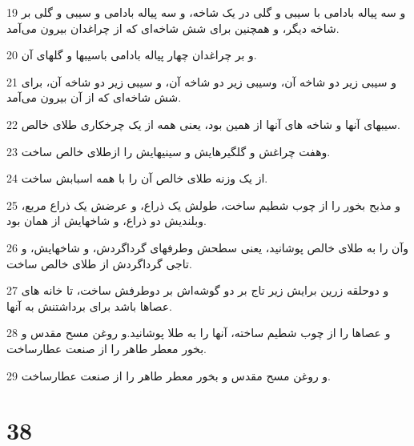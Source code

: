 \par 19 و سه پیاله بادامی با سیبی و گلی در یک شاخه، و سه پیاله بادامی و سیبی و گلی بر شاخه دیگر، و همچنین برای شش شاخه‌ای که از چراغدان بیرون می‌آمد.
\par 20 و بر چراغدان چهار پیاله بادامی باسیبها و گلهای آن.
\par 21 و سیبی زیر دو شاخه آن، وسیبی زیر دو شاخه آن، و سیبی زیر دو شاخه آن، برای شش شاخه‌ای که از آن بیرون می‌آمد.
\par 22 سیبهای آنها و شاخه های آنها از همین بود، یعنی همه از یک چرخکاری طلای خالص.
\par 23 وهفت چراغش و گلگیرهایش و سینیهایش را ازطلای خالص ساخت.
\par 24 از یک وزنه طلای خالص آن را با همه اسبابش ساخت.
\par 25 و مذبح بخور را از چوب شطیم ساخت، طولش یک ذراع، و عرضش یک ذراع مربع، وبلندیش دو ذراع، و شاخهایش از همان بود.
\par 26 وآن را به طلای خالص پوشانید، یعنی سطحش وطرفهای گرداگردش، و شاخهایش، و تاجی گرداگردش از طلای خالص ساخت.
\par 27 و دوحلقه زرین برایش زیر تاج بر دو گوشه‌اش بر دوطرفش ساخت، تا خانه های عصاها باشد برای برداشتنش به آنها.
\par 28 و عصاها را از چوب شطیم ساخته، آنها را به طلا پوشانید.و روغن مسح مقدس و بخور معطر طاهر را از صنعت عطارساخت.
\par 29 و روغن مسح مقدس و بخور معطر طاهر را از صنعت عطارساخت.
 
\chapter{38}

